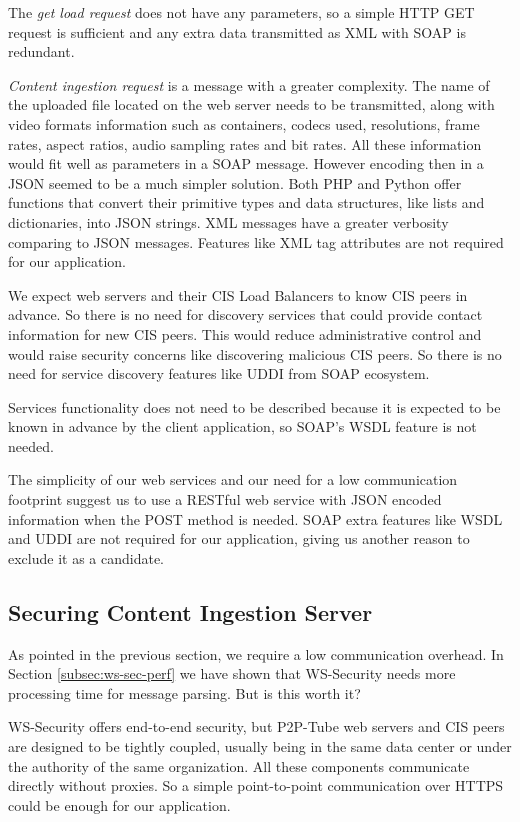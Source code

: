 The \textit{get load request} does not have any parameters, so a simple HTTP GET request is sufficient and any extra data transmitted as XML with SOAP is redundant.

\textit{Content ingestion request} is a message with a greater complexity. The name of the uploaded file located on the web server needs to be transmitted, along with video formats information such as containers, codecs used, resolutions, frame rates, aspect ratios, audio sampling rates and bit rates. All these information would fit well as parameters in a SOAP message. However encoding then in a JSON seemed to be a much simpler solution. Both PHP and Python offer functions that convert their primitive types and data structures, like lists and dictionaries, into JSON strings. XML messages have a greater verbosity comparing to JSON messages. Features like XML tag attributes are not required for our application.

We expect web servers and their CIS Load Balancers to know CIS peers in advance. So there is no need for discovery services that could provide contact information for new CIS peers. This would reduce administrative control and would raise security concerns like discovering malicious CIS peers. So there is no need for service discovery features like UDDI from SOAP ecosystem.

Services functionality does not need to be described because it is expected to be known in advance by the client application, so SOAP's WSDL feature is not needed.

The simplicity of our web services and our need for a low communication footprint suggest us to use a RESTful web service with JSON encoded information when the POST method is needed. SOAP extra features like WSDL and UDDI are not required for our application, giving us another reason to exclude it as a candidate.

\subsection{Securing Content Ingestion Server}
\label{subsec:securing-cis}

As pointed in the previous section, we require a low communication overhead. In Section \ref{subsec:ws-sec-perf} we have shown that WS-Security needs more processing time for message parsing. But is this worth it?

WS-Security offers end-to-end security, but P2P-Tube web servers and CIS peers are designed to be tightly coupled, usually being in the same data center or under the authority of the same organization. All these components communicate directly without proxies. So a simple point-to-point communication over HTTPS could be enough for our application.

